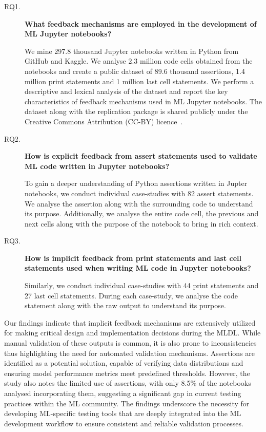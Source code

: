 \begin{description}
  \item[RQ1.] \textbf{What feedback mechanisms are employed in the development of ML Jupyter notebooks?}

    We mine 297.8 thousand Jupyter notebooks written in Python from GitHub and Kaggle. We analyse 2.3 million code cells obtained from the notebooks and create a public dataset of 89.6 thousand assertions, 1.4 million print statements and 1 million last cell statements. We perform a descriptive and lexical analysis of the dataset and report the key characteristics of feedback mechanisms used in ML Jupyter notebooks. The dataset along with the replication package is shared publicly under the Creative Commons Attribution (CC-BY) licence~\cite{replication}.

  \item[RQ2.] \textbf{How is explicit feedback from assert statements used to validate ML code written in Jupyter notebooks?}

    To gain a deeper understanding of Python assertions written in Jupter notebooks, we conduct individual case-studies with 82 assert statements. We analyse the assertion along with the surrounding code to understand its purpose. Additionally, we analyse the entire code cell, the previous and next cells along with the purpose of the notebook to bring in rich context.

  \item[RQ3.] \textbf{How is implicit feedback from print statements and last cell statements used when writing ML code in Jupyter notebooks?}

    Similarly, we conduct individual case-studies with 44 print statements and 27 last cell statements. During each case-study, we analyse the code statement along with the raw output to understand its purpose.
\end{description}


Our findings indicate that implicit feedback mechanisms are extensively utilized for making critical design and implementation decisions during the MLDL. While manual validation of these outputs is common, it is also prone to inconsistencies thus highlighting the need for automated validation mechanisms. Assertions are identified as a potential solution, capable of verifying data distributions and ensuring model performance metrics meet predefined thresholds. However, the study also notes the limited use of assertions, with only 8.5\% of the notebooks analysed incorporating them, suggesting a significant gap in current testing practices within the ML community. The findings underscore the necessity for developing ML-specific testing tools that are deeply integrated into the ML development workflow to ensure consistent and reliable validation processes.


